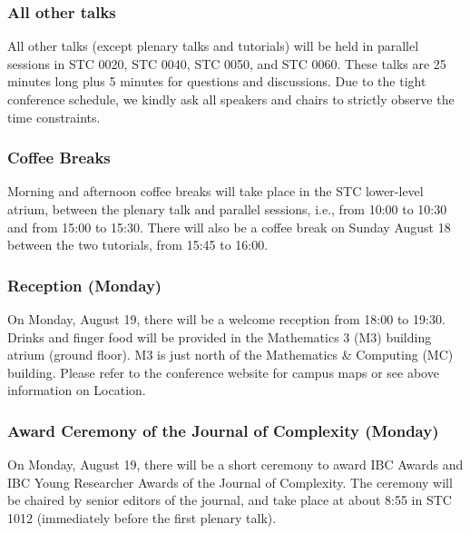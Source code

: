 \subsubsection{All other talks}

All other talks (except plenary talks and tutorials) will be held in 
parallel sessions in STC 0020, STC 0040, STC 0050, and STC 0060. These talks 
are 25 minutes long plus 5 minutes
for questions and discussions. Due to the tight
conference schedule, we kindly ask all speakers and chairs to strictly observe
the time constraints.


\subsubsection{Coffee Breaks}

Morning and afternoon coffee breaks will take place in the STC lower-level atrium, between the plenary talk and parallel sessions, i.e., from 10:00 to 10:30 and from 15:00 to 15:30. There will also be a coffee break on Sunday August 18 between the two tutorials, from 15:45 to 16:00.


\subsubsection{Reception (Monday)}

On Monday, August 19, there will be a welcome reception from 18:00 to 19:30.
Drinks and finger food will be provided in the Mathematics 3 (M3) building atrium (ground floor). 
M3 is just north of the Mathematics \& Computing (MC) building. 
Please refer to the conference website for campus maps or see above information on Location.


\subsubsection{Award Ceremony of the Journal of Complexity (Monday)}

On Monday, August 19, there will be a short ceremony to award IBC Awards and IBC Young Researcher Awards of the Journal of Complexity. 
The ceremony will be chaired by senior editors of the journal, and take place at about 8:55 in STC 1012
(immediately before the first plenary talk).



